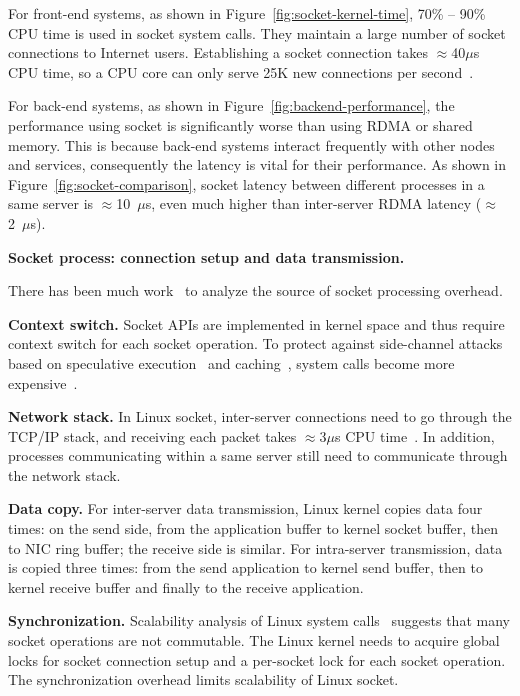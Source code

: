 For front-end systems, as shown in Figure~\ref{fig:socket-kernel-time}, 70\% -- 90\% CPU time is used in socket system calls. They maintain a large number of socket connections to Internet users. Establishing a socket connection takes $\approx$40$\mu$s CPU time, so a CPU core can only serve 25K new connections per second~\cite{lin2016scalable}.

For back-end systems, as shown in Figure~\ref{fig:backend-performance}, the performance using socket is significantly worse than using RDMA or shared memory. This is because back-end systems interact frequently with other nodes and services, consequently the latency is vital for their performance. As shown in Figure~\ref{fig:socket-comparison}, socket latency between different processes in a same server is $\approx$10~$\mu$s, even much higher than inter-server RDMA latency ($\approx$2~$\mu$s).

\textbf{Socket process: connection setup and data transmission.}

There has been much work~\cite{peter2016arrakis,lin2016scalable} to analyze the source of socket processing overhead.

\textbf{Context switch.}
Socket APIs are implemented in kernel space and thus require context switch for each socket operation. To protect against side-channel attacks based on speculative execution~\cite{Kocher2018spectre} and caching~\cite{Lipp2018meltdown}, system calls become more expensive~\cite{kpti}.

\textbf{Network stack.}
In Linux socket, inter-server connections need to go through the TCP/IP stack, and receiving each packet takes $\approx$3$\mu$s CPU time~\cite{peter2016arrakis}. In addition, processes communicating within a same server still need to communicate through the network stack.

\textbf{Data copy.}
For inter-server data transmission, Linux kernel copies data four times: on the send side, from the application buffer to kernel socket buffer, then to NIC ring buffer; the receive side is similar.
For intra-server transmission, data is copied three times: from the send application to kernel send buffer, then to kernel receive buffer and finally to the receive application.

\textbf{Synchronization.}
Scalability analysis of Linux system calls~\cite{boyd2010analysis} suggests that many socket operations are not commutable. The Linux kernel needs to acquire global locks for socket connection setup and a per-socket lock for each socket operation. The synchronization overhead limits scalability of Linux socket.


